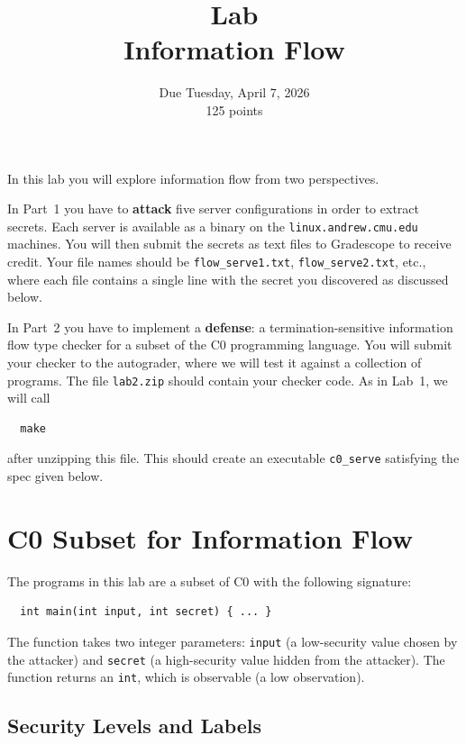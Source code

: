 \documentclass[11pt]{article}
\title{Lab \lecnum \\ Information Flow}
\date{Due Tuesday, April 7, 2026 \\ 125 points}
\begin{document}
\maketitle

In this lab you will explore information flow from two perspectives.

In Part~1 you have to \textbf{attack} five server configurations in order to
extract secrets.  Each server is available as a binary on the
\texttt{linux.andrew.cmu.edu} machines.
You will then submit the secrets as text files to Gradescope to receive credit.
Your file names should be \verb'flow_serve1.txt', \verb'flow_serve2.txt', etc.,
where each file contains a single line with the secret you discovered as
discussed below.

In Part~2 you have to implement a \textbf{defense}: a termination-sensitive
information flow type checker for a subset of the C0 programming language.
You will submit your checker to the autograder, where we will test it against a
collection of programs.  The file \texttt{lab2.zip} should contain your checker
code.  As in Lab~1, we will call
\begin{verbatim}
  make
\end{verbatim}
after unzipping this file.  This should create an executable \verb'c0_serve'
satisfying the spec given below.


\section{C0 Subset for Information Flow}

The programs in this lab are a subset of C0 with the following signature:
\begin{verbatim}
  int main(int input, int secret) { ... }
\end{verbatim}
The function takes two integer parameters: \texttt{input} (a low-security
value chosen by the attacker) and \texttt{secret} (a high-security value hidden
from the attacker).  The function returns an \texttt{int}, which is
observable (a low observation).

\subsection{Security Levels and Labels}
\end{document}
